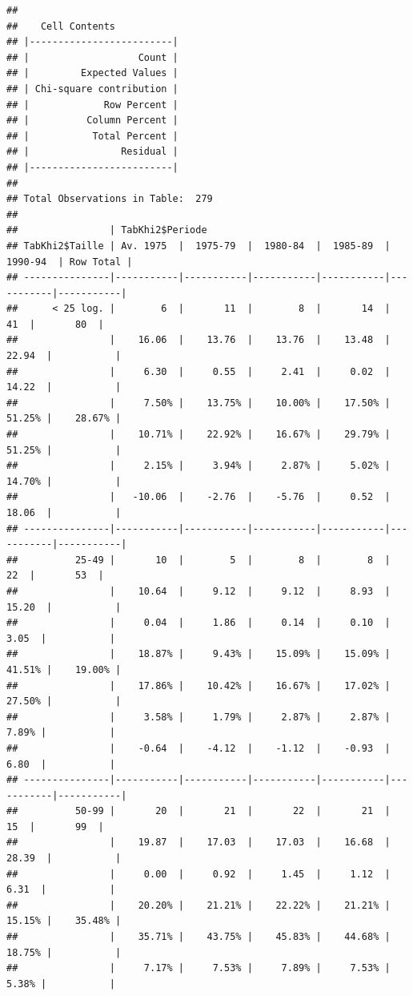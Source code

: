 \documentclass[
  11pt,
  french,
]{book}
\begin{document}
\begin{verbatim}
## 
##    Cell Contents
## |-------------------------|
## |                   Count |
## |         Expected Values |
## | Chi-square contribution |
## |             Row Percent |
## |          Column Percent |
## |           Total Percent |
## |                Residual |
## |-------------------------|
## 
## Total Observations in Table:  279 
## 
##                | TabKhi2$Periode 
## TabKhi2$Taille | Av. 1975  |  1975-79  |  1980-84  |  1985-89  |  1990-94  | Row Total | 
## ---------------|-----------|-----------|-----------|-----------|-----------|-----------|
##      < 25 log. |        6  |       11  |        8  |       14  |       41  |       80  | 
##                |    16.06  |    13.76  |    13.76  |    13.48  |    22.94  |           | 
##                |     6.30  |     0.55  |     2.41  |     0.02  |    14.22  |           | 
##                |     7.50% |    13.75% |    10.00% |    17.50% |    51.25% |    28.67% | 
##                |    10.71% |    22.92% |    16.67% |    29.79% |    51.25% |           | 
##                |     2.15% |     3.94% |     2.87% |     5.02% |    14.70% |           | 
##                |   -10.06  |    -2.76  |    -5.76  |     0.52  |    18.06  |           | 
## ---------------|-----------|-----------|-----------|-----------|-----------|-----------|
##          25-49 |       10  |        5  |        8  |        8  |       22  |       53  | 
##                |    10.64  |     9.12  |     9.12  |     8.93  |    15.20  |           | 
##                |     0.04  |     1.86  |     0.14  |     0.10  |     3.05  |           | 
##                |    18.87% |     9.43% |    15.09% |    15.09% |    41.51% |    19.00% | 
##                |    17.86% |    10.42% |    16.67% |    17.02% |    27.50% |           | 
##                |     3.58% |     1.79% |     2.87% |     2.87% |     7.89% |           | 
##                |    -0.64  |    -4.12  |    -1.12  |    -0.93  |     6.80  |           | 
## ---------------|-----------|-----------|-----------|-----------|-----------|-----------|
##          50-99 |       20  |       21  |       22  |       21  |       15  |       99  | 
##                |    19.87  |    17.03  |    17.03  |    16.68  |    28.39  |           | 
##                |     0.00  |     0.92  |     1.45  |     1.12  |     6.31  |           | 
##                |    20.20% |    21.21% |    22.22% |    21.21% |    15.15% |    35.48% | 
##                |    35.71% |    43.75% |    45.83% |    44.68% |    18.75% |           | 
##                |     7.17% |     7.53% |     7.89% |     7.53% |     5.38% |           | 

\end{verbatim}
\end{document}
